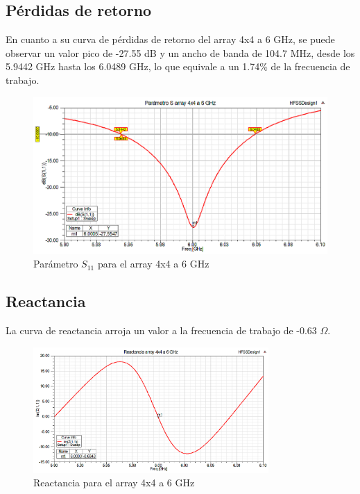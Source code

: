 \subsection{Pérdidas de retorno}
\par En cuanto a su curva de pérdidas de retorno del array 4x4 a 6 GHz, se puede observar un valor pico de -27.55 dB y un ancho de banda de 104.7 MHz, desde los 5.9442 GHz hasta los 6.0489 GHz, lo que equivale a un 1.74\% de la frecuencia de trabajo.
\\
\begin{figure}[H]
    \centering
        \includegraphics[width=\textwidth]{archivos/analisis/4x42/1}
        \caption{Parámetro $S_{11}$ para el array 4x4 a 6 GHz}
        \label{fig:s4x42}
\end{figure}

\newpage
\subsection{Reactancia}
\par La curva de reactancia arroja un valor a la frecuencia de trabajo de -0.63 $\Omega$. 
\\
\begin{figure}[H]
    \centering
        \includegraphics[width=0.8\textwidth]{archivos/analisis/4x42/2}
        \caption{Reactancia para el array 4x4 a 6 GHz}
        \label{fig:react4x42}
\end{figure}

